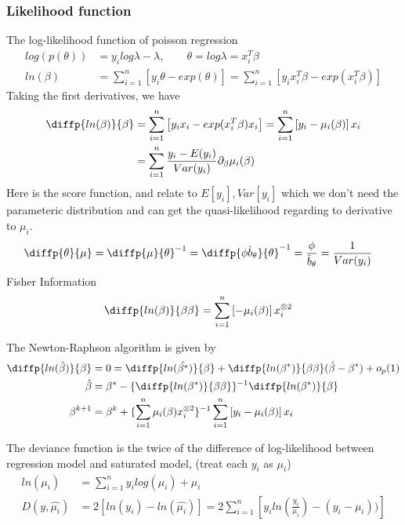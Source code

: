  \subsubsection{Likelihood function} 
The log-likelihood function of poisson regression
\begin{align*}
  log (p(\theta)) &= y_i log \lambda - \lambda , \qquad \theta = log \lambda = x_i^T \beta \\
   ln(\beta) &= \sum_{i=1}^n \left[ y_i \theta -  exp(\theta) \right] = \sum_{i=1}^n \left[ y_i x_i^T \beta -  exp(x_i^T \beta) \right] 
\end{align*}
Taking the first derivatives, we have
\begin{align*}
  \diffp {ln(\beta)}{\beta} &= \sum_{i=1}^n \left[ y_i x_i - exp(x_i^T\beta) x_i \right] = \sum_{i=1}^n \left[ y_i - \mu_i(\beta)  \right]x_i \\
&= \sum_{i=1}^n \frac{ y_i - E(y_i) }{Var(y_i)} \partial_{\beta} \mu_i(\beta)
\end{align*}
Here is the score function, and relate to $E[y_i], Var[y_i]$ which we don't need the parameteric distribution and can get the quasi-likelihood regarding to derivative to $\mu_i$.
\begin{align*}
  \diffp {\theta}{\mu} &=   \diffp {\mu}{\theta}^{-1} = \diffp {\phi \dot{b}_{\theta}}{\theta}^{-1} = \frac{\phi}{\ddot{b}_{\theta}} = \frac{1}{Var(y_i)}
\end{align*}
Fisher Information
\begin{align*}
  \diffp {ln(\beta)}{\beta \beta} &= \sum_{i=1}^n \left[ - \mu_i(\beta)  \right]x_i ^{\otimes 2}
\end{align*}

The Newton-Raphson algorithm is given by 
\begin{align*}
   \diffp {ln(\hat{\beta})}{\beta} &= 0 = \diffp {ln(\hat{\beta^{\ast}})}{\beta} +  \diffp {ln(\beta^{\ast})}{\beta \beta} (\hat{\beta} - \beta^{\ast}) + o_p(1)\\
   \hat{\beta} &=  \beta^{\ast} - \{ \diffp {ln(\beta^{\ast})}{\beta \beta} \}^{-1} \diffp {ln(\beta^{\ast})}{\beta} \\
   \beta^{k+1} &=\beta^{k} + \{ \sum_{i=1}^n \mu_i(\beta)  x_i ^{\otimes 2} \}^{-1}  \sum_{i=1}^n \left[ y_i - \mu_i(\beta)  \right]x_i
\end{align*}

The deviance function is the twice of the difference of log-likelihood between regression model and saturated model, (treat each $y_i$ as $\mu_i$)
\begin{align*}
   ln(\mu_i) &= \sum_{i=1}^n y_i log(\mu_i) + \mu_i\\
   D(y, \hat{\mu_i}) &= 2[ ln(y_i) - ln(\hat{\mu_i})] =  2 \sum_{i=1}^n[y_i ln(\frac{y_i}{\mu_i}) - (y_i-\mu_i) )] 
\end{align*}

